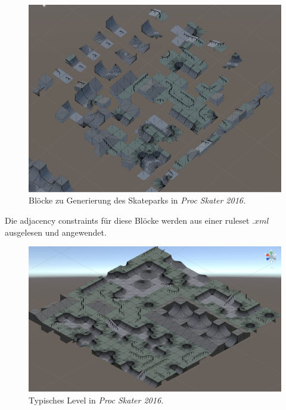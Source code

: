 \documentclass[12pt, a4paper,twoside,openright]{report} %
\begin{document}
\begin{figure}[H]
    \centering
    \includegraphics[width=0.9\linewidth]{images/proc-skater-ruleset.png}%
    \caption{Blöcke zu Generierung des Skateparks in \textit{Proc Skater 2016.} \cite{procskater2016}}%
\end{figure}

Die adjacency constraints für diese Blöcke werden aus einer ruleset $.xml$ ausgelesen und angewendet.

\begin{figure}[H]
    \centering
    \includegraphics[width=0.9\linewidth]{images/proc-skate-level.png}%
    \caption{Typisches Level in \textit{Proc Skater 2016.} \cite{procskater2016}}%
\end{figure}

\pagebreak
\end{document}
